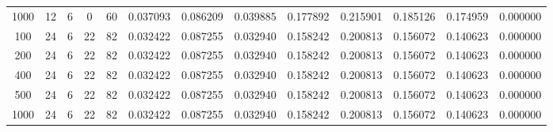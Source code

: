 \begin{table}[h]
\begin{tabular}{ccccccccccccc}
1000 & 12 & 6 & 0 & 60 & 0.037093 & 0.086209 & 0.039885 & 0.177892 & 0.215901 & 0.185126 & 0.174959 & 0.000000 \\
100 & 24 & 6 & 22 & 82 & 0.032422 & 0.087255 & 0.032940 & 0.158242 & 0.200813 & 0.156072 & 0.140623 & 0.000000 \\
200 & 24 & 6 & 22 & 82 & 0.032422 & 0.087255 & 0.032940 & 0.158242 & 0.200813 & 0.156072 & 0.140623 & 0.000000 \\
400 & 24 & 6 & 22 & 82 & 0.032422 & 0.087255 & 0.032940 & 0.158242 & 0.200813 & 0.156072 & 0.140623 & 0.000000 \\
500 & 24 & 6 & 22 & 82 & 0.032422 & 0.087255 & 0.032940 & 0.158242 & 0.200813 & 0.156072 & 0.140623 & 0.000000 \\
1000 & 24 & 6 & 22 & 82 & 0.032422 & 0.087255 & 0.032940 & 0.158242 & 0.200813 & 0.156072 & 0.140623 & 0.000000 \\
\bottomrule
\end{tabular}
\end{table}

